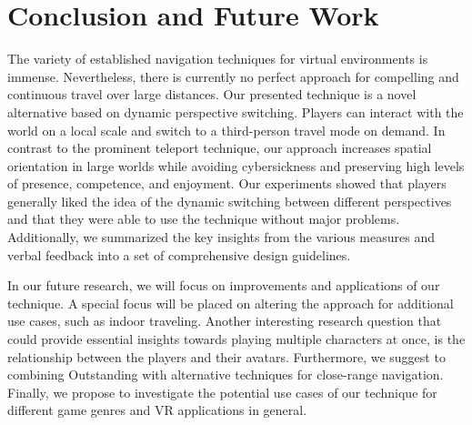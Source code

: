 \documentclass{sigchi}
\begin{document}
\section{Conclusion and Future Work}
The variety of established navigation techniques for virtual environments is immense. Nevertheless, there is currently no perfect approach for compelling and continuous travel over large distances. Our presented technique is a novel alternative based on dynamic perspective switching. Players can interact with the world on a local scale and switch to a third-person travel mode on demand. In contrast to the prominent teleport technique, our approach increases spatial orientation in large worlds while avoiding cybersickness and preserving high levels of presence, competence, and enjoyment. Our experiments showed that players generally liked the idea of the dynamic switching between different perspectives and that they were able to use the technique without major problems. Additionally, we summarized the key insights from the various measures and verbal feedback into a set of comprehensive design guidelines.\par
In our future research, we will focus on improvements and applications of our technique. A special focus will be placed on altering the approach for additional use cases, such as indoor traveling. Another interesting research question that could provide essential insights towards playing multiple characters at once, is the relationship between the players and their avatars. Furthermore, we suggest to combining Outstanding with alternative techniques for close-range navigation. Finally, we propose to investigate the potential use cases of our technique for different game genres and VR applications in general. 

\balance{}



\end{document}
